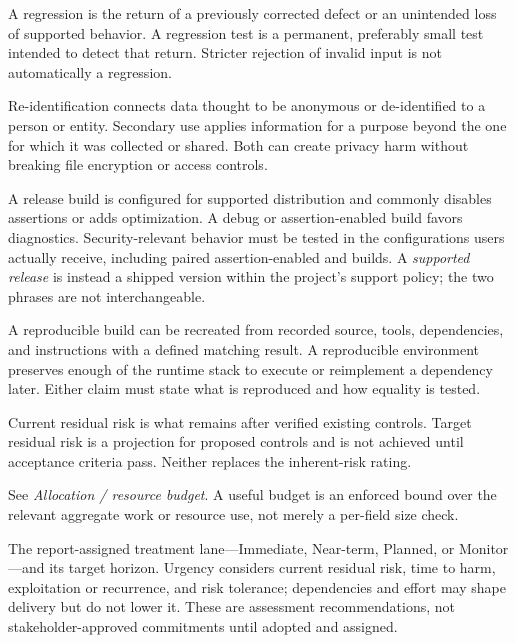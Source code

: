 \documentclass[../main.tex]{subfiles}
\begin{document}
\begin{description}[leftmargin=1.5em,style=nextline]
\item[Regression / regression test.]
A regression is the return of a previously corrected defect or an unintended
loss of supported behavior. A regression test is a permanent, preferably
small test intended to detect that return. Stricter rejection of invalid input
is not automatically a regression.

\item[Re-identification / secondary use.]
Re-identification connects data thought to be anonymous or de-identified to a
person or entity. Secondary use applies information for a purpose beyond the
one for which it was collected or shared. Both can create privacy harm without
breaking file encryption or access controls.

\item[Release build / debug build.]
A release build is configured for supported distribution and commonly disables
assertions or adds optimization. A debug or assertion-enabled build favors
diagnostics. Security-relevant behavior must be tested in the configurations
users actually receive, including paired assertion-enabled and
 builds. A \emph{supported release} is instead a shipped version
within the project's support policy; the two phrases are not interchangeable.

\item[Reproducible build / reproducible environment.]
A reproducible build can be recreated from recorded source, tools, dependencies,
and instructions with a defined matching result. A reproducible environment
preserves enough of the runtime stack to execute or reimplement a dependency
later. Either claim must state what is reproduced and how equality is tested.

\item[Residual risk: current and target.]
Current residual risk is what remains after verified existing controls. Target
residual risk is a projection for proposed controls and is not achieved until
acceptance criteria pass. Neither replaces the inherent-risk rating.

\item[Resource budget.]
See \emph{Allocation / resource budget}. A useful budget is an enforced bound
over the relevant aggregate work or resource use, not merely a per-field size
check.

\item[Response urgency / response clock.]
The report-assigned treatment lane---Immediate, Near-term, Planned, or
Monitor---and its target horizon. Urgency considers current residual risk, time
to harm, exploitation or recurrence, and risk tolerance; dependencies and
effort may shape delivery but do not lower it. These are assessment
recommendations, not stakeholder-approved commitments until adopted and
assigned.


\end{description}
\end{document}

